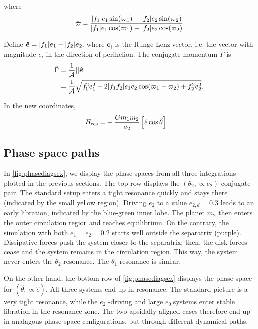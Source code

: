\documentclass[usenatbib]{mnras}
\renewcommand{\v}[1]{\boldsymbol{ #1 }}
\DeclarePairedDelimiter{\abs}{|}{|}
\DeclarePairedDelimiter{\norm}{||}{||}
\begin{document}
\noindent
where
\begin{equation}
\hat\varpi = \frac{\abs{f_1} e_1\sin(\varpi_1) -
  \abs{f_2}e_2\sin(\varpi_2)} {\abs{f_1}e_1\cos(\varpi_1) -
  \abs{f_2}e_2\cos(\varpi_2)}
\end{equation}

\noindent Define \(\v{\hat e} = \abs{f_1}\v e_1 - \abs{f_2}\v
e_2\), where \(\v e_i\) is the Runge-Lenz vector, i.e. the vector with
magnitude \(e_i\) in the direction of perihelion.  The conjugate
momentum \(\hat\Gamma\) is
\begin{align*}
\hat\Gamma &= \frac{1}{\mathcal{A}} \norm{\v{\hat e}}\\
           &= \frac{1}{\mathcal{A}} \sqrt{f_1^2e_1^2 - 2\abs{f_1f_2}e_1e_2\cos(\varpi_1-\varpi_2) + f_2^2e_2^2}.
\end{align*}

\noindent In the new coordinates,
\begin{align}
  H_{\rm res} = & -\frac{G m_{1} m_{2}}{a_{2}}
                  \left[
\hat e \cos \hat\theta
                  \right]
\end{align}

\subsection{Phase space paths}
\label{sec:org281882f}
\begin{figure*}
  \centering
  \texttt{[image: \{./relative-geometry]}.png}
  \caption{ }
  \label{fig:relgeom}
\end{figure*}
In \ref{fig:phasediagsex}, we display the phase spaces from all three
integrations plotted in the previous sections.
The top row displays the \((\theta_2, \propto e_2)\) conjugate pair.
The standard setup enters a tight resonance quickly and stays there (indicated by the small yellow region).
Driving \(e_2\) to a value \(e_{2,d}=0.3\) leads to an early libration, indicated by the blue-green inner lobe.
The planet \(m_2\) then enters the outer circulation region and reaches equilibrium.
On the contrary, the simulation with both \(e_1 = e_2 = 0.2\) starts well outside the separatrix (purple).
Dissipative forces push the system closer to the separatrix; then, the disk forces cease
and the system remains in the circulation region. This way, the system never enters the \(\theta_2\)
resonance. The \(\theta_1\) resonance is similar.

On the other hand, the bottom row of \ref{fig:phasediagsex} displays the
phase space for \((\hat\theta,\propto \hat e)\).
All three systems end up in resonance. The standard picture is a very tight resonance, while the
\(e_2\) -driving and large \(e_0\) systems enter stable libration in the resonance zone.
The two apsidally aligned cases therefore end up in analagous phase space configurations, but
through different dynamical paths.
\end{document}
